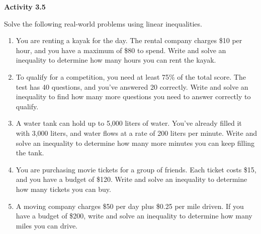  \vspace{0.3ex}
\noindent\textbf{Activity 3.5}

\vspace{0.2ex}

Solve the following real-world problems using linear inequalities.
\begin{enumerate}[noitemsep, label = \color{blue}\arabic*. ]
    \item You are renting a kayak for the day. The rental company charges \$10 per hour, and you have a maximum of \$80 to spend. Write and solve an inequality to determine how many hours you can rent the kayak.
    \item To qualify for a competition, you need at least 75\% of the total score. The test has 40 questions, and you’ve answered 20 correctly. Write and solve an inequality to find how many more questions you need to answer correctly to qualify.
    \item A water tank can hold up to 5,000 liters of water. You’ve already filled it with 3,000 liters, and water flows at a rate of 200 liters per minute. Write and solve an inequality to determine how many more minutes you can keep filling the tank.
    \item You are purchasing movie tickets for a group of friends. Each ticket costs \$15, and you have a budget of \$120. Write and solve an inequality to determine how many tickets you can buy.
    \item A moving company charges \$50 per day plus \$0.25 per mile driven. If you have a budget of \$200, write and solve an inequality to determine how many miles you can drive.
\end{enumerate}


